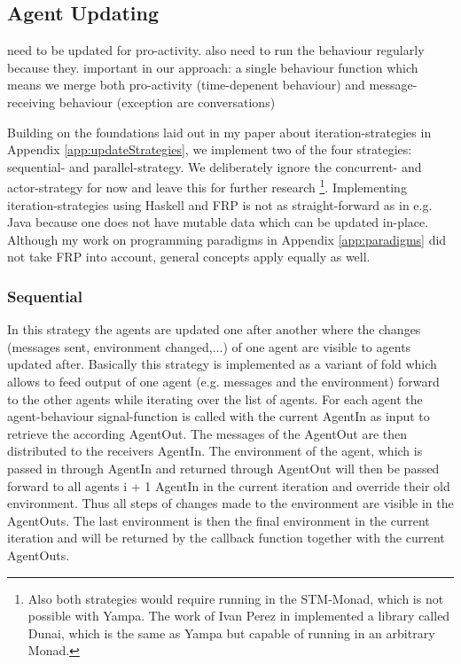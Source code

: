 \subsection{Agent Updating}
need to be updated for pro-activity. also need to run the behaviour regularly because they.
important in our approach: a single behaviour function which means we merge both pro-activity (time-depenent behaviour) and message-receiving behaviour (exception are conversations)

Building on the foundations laid out in my paper about iteration-strategies in Appendix \ref{app:updateStrategies}, we implement two of the four strategies: sequential- and parallel-strategy. We deliberately ignore the concurrent- and actor-strategy for now and leave this for further research \footnote{Also both strategies would require running in the STM-Monad, which is not possible with Yampa. The work of Ivan Perez in \cite{perez_functional_2016} implemented a library called Dunai, which is the same as Yampa but capable of running in an arbitrary Monad.}.
Implementing iteration-strategies using Haskell and FRP is not as straight-forward as in e.g. Java because one does not have mutable data which can be updated in-place. Although my work on programming paradigms in Appendix \ref{app:paradigms} did not take FRP into account, general concepts apply equally as well.

\subsubsection{Sequential}
In this strategy the agents are updated one after another where the changes (messages sent, environment changed,...) of one agent are visible to agents updated after. Basically this strategy is implemented as a variant of fold which allows to feed output of one agent (e.g. messages and the environment) forward to the other agents while iterating over the list of agents. For each agent the agent-behaviour signal-function is called with the current AgentIn as input to retrieve the according AgentOut. The messages of the AgentOut are then distributed to the receivers AgentIn.
The environment of the agent, which is passed in through AgentIn and returned through AgentOut will then be passed forward to all agents i + 1 AgentIn in the current iteration and override their old environment. Thus all steps of changes made to the environment are visible in the AgentOuts. The last environment is then the final environment in the current iteration and will be returned by the callback function together with the current AgentOuts.

